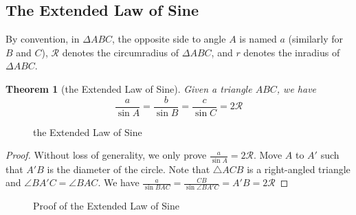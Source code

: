 \documentclass{article}
\newtheorem{theorem}{Theorem}
\theoremstyle{definition}
\begin{document}
\subsection{The Extended Law of Sine}
By convention, in $\Delta ABC$, the opposite side to angle $A$ is named $a$ (similarly for $B$ and $C$), $\mathcal{R}$ denotes the circumradius of $\Delta ABC$, and $r$ denotes the inradius of $\Delta ABC$.
\begin{mdframed}
	\begin{theorem}[the Extended Law of Sine]
		Given a triangle $ABC$, we have 
		\begin{equation*}
			\frac{a}{\sin A} = \frac{b}{\sin B} = \frac{c}{\sin C} = 2\mathcal{R}
		\end{equation*}
	\end{theorem}
	\begin{center}
		\begin{figure}[H]
			\centering
			\caption{the Extended Law of Sine}
		\end{figure}
	\end{center}
\end{mdframed}
\begin{proof}
	Without loss of generality, we only prove $\frac{a}{\sin A} = 2\mathcal{R}$. Move $A$ to $A'$ such that $A'B$ is the diameter of the circle. Note that $\triangle ACB$ is a right-angled triangle and $\angle BA'C = \angle BAC$. We have $\frac{a}{\sin BAC} = \frac{CB}{\sin \angle BA'C} = A'B = 2\mathcal{R}$
\end{proof}
\begin{figure}[H]
	\centering
	\caption{Proof of the Extended Law of Sine}
\end{figure}
\end{document}
